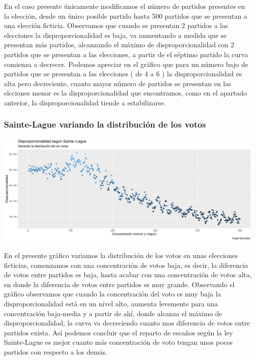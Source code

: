 \documentclass[12pt,a4paper,]{book}
\numberwithin{dummy}{section}
\theoremstyle{ocrenumbox}
\theoremstyle{blacknumex}
\theoremstyle{blacknumbox}
\theoremstyle{ocrenum}
\theoremstyle{ocrenum}
\begin{document}
En el caso presente únicamente modificamos el número de partidos
presentes en la elección, desde un único posible partido hasta 500
partidos que se presentan a una elección ficticia. Observamos que cuando
se presentan 2 partidos a las elecciones la disproporcionalidad es baja,
va aumentando a medida que se presentan más partidos, alcanzando el
máximo de disproporcionalidad con 2 partidos que se presentan a las
elecciones, a partir de el séptimo partido la curva comienza a decrecer.
Podemos apreciar en el gráfico que para un número bajo de partidos que
se presentan a las elecciones ( de 4 a 6 ) la disproporcionalidad es
alta pero decreciente, cuanto mayor número de partidos se presentan en
las elcciones menor es la disproporcionalidad que encontramos, como en
el apartado anterior, la disproporcionalidad tiende a estabilizarse.

\hypertarget{sainte-lague-variando-la-distribuciuxf3n-de-los-votos}{%
\subsubsection{Sainte-Lague variando la distribución de los
votos}\label{sainte-lague-variando-la-distribuciuxf3n-de-los-votos}}

\begin{center}\includegraphics[width=0.95\linewidth]{figurasR/unnamed-chunk-16-1} \end{center}

En el presente gráfico variamos la distribución de los votos en unas
elecciones ficticias, comenzamos con una concentración de votos baja, es
decir, la diferencia de votos entre partidos es baja, hasta acabar con
una concentración de votos alta, en donde la diferencia de votos entre
partidos es muy grande. Observando el gráfico observamos que cuando la
concentración del voto es muy baja la disproporcionalidad está en un
nivel alto, aumenta levemente para una concentración baja-media y a
partir de ahí, donde alcanza el máximo de disproporcionalidad, la curva
va decreciendo cuanto mas diferencia de votos entre partidos exista. Así
podemos concluir que el reparto de escaños según la ley Sainte-Lague es
mejor cuanto más concentración de voto tengan unos pocos partidos con
respecto a los demás.
\end{document}
